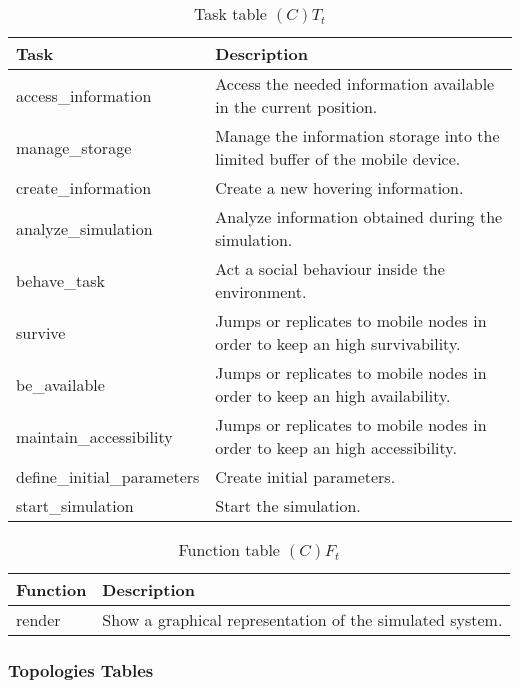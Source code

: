 \begin{table}[H]
	\centering
	\begin{tabular}{|p{5cm}|p{7cm}|}
			\hline
			\textbf{Task} & \textbf{Description} \\
			\hline
			access\_information & Access the needed information available in the
			current position.\\
			\hline
			manage\_storage & Manage the information storage into the limited buffer
			of the mobile device. \\
			\hline
			create\_information & Create a new hovering information. \\
			\hline
			analyze\_simulation & Analyze information obtained during the
			simulation.\\
			\hline
			behave\_task & Act a social behaviour inside the environment. \\
			\hline
			survive & Jumps or replicates to mobile nodes in order to keep an high
			survivability. \\
			\hline
			be\_available & Jumps or replicates to mobile nodes in order to keep an
			high availability. \\
			\hline
			maintain\_accessibility & Jumps or replicates to mobile nodes in order to
			keep an high accessibility. \\
			\hline
			define\_initial\_parameters & Create initial parameters. \\
			\hline
			start\_simulation & Start the simulation. \\
			\hline
		\end{tabular}
	\caption{Task table $(C)T_t$}
	\label{tab:ctt}
\end{table}

\begin{table}[H]
	\centering
	\begin{tabular}{|p{5cm}|p{7cm}|}
			\hline
			\textbf{Function} & \textbf{Description} \\
			\hline
			render & Show a graphical representation of the simulated system. \\
			\hline
		\end{tabular}
	\caption{Function table $(C)F_t$}
	\label{tab:cft}
\end{table}

\subsubsection{Topologies Tables}


